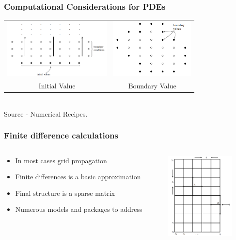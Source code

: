 \documentclass[10pt]{beamer}
\begin{document}
\begin{frame}
  \frametitle{Computational Considerations for PDEs}
  \begin{center}
    \begin{tabular}{cc}
      \includegraphics[height=3cm]{initial-value}&
      \includegraphics[height=3cm]{boundary-value}\\
      Initial Value & Boundary Value\\
    \end{tabular}  
  \end{center}

  ~\\[1cm]
  Source - Numerical Recipes. 
\end{frame}

\begin{frame}
  \frametitle{Finite difference calculations}
  \begin{columns}
    \begin{column}{7cm}
      \begin{itemize}
      \item In most cases grid propagation
      \item Finite differences is a basic approximation
      \item Final structure is a sparse matrix 
      \item Numerous models and packages to address
      \end{itemize}
    \end{column}
    \begin{column}{4cm}
      \includegraphics[width=3.5cm]{finite-differences}
    \end{column}
  \end{columns}
\end{frame}
\end{document}
